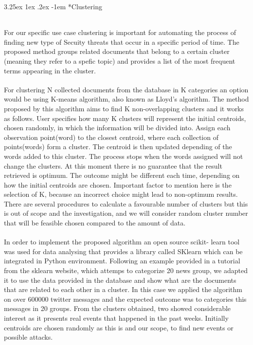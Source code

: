\documentclass[12pt]{article}
\makeatletter
\renewcommand\paragraph{\@startsection{paragraph}{5}{\z@}%
  {3.25ex \@plus1ex \@minus.2ex}%
  {-1em}%
  {\normalfont\normalsize\bfseries}}
\makeatother
\begin{document}
\paragraph*{Clustering}
\hfill \break 
\\
For our specific use case clustering is important for automating the process of finding new type of Secuity threats that occur in a specific period of time. The proposed method groups related documents that belong to a certain cluster (meaning they refer to a spefic topic) and provides a list of the most frequent terms appearing in the cluster.
\\
\\
For clustering N collected documents from the database in K categories an option would be using K-means\cite{k-means} algorithm, also known as Lloyd's algorithm. The method\cite{k-means-example} proposed by this algorithm aims to find K non-overlapping clusters and it works as follows. User specifies how many K clusters will represent the initial centroids, chosen randomly, in which the information will be divided into. Assign each observation point(word) to the closest centroid, where each collection of points(words) form a cluster. The centroid is then updated depending of the words added to this cluster. The process stops when the words assigned will not change the clusters. At this moment there is no guarantee that the result retrieved is optimum. The outcome might be different each time, depending on how the initial centroids are chosen. Important factor to mention here is the selection of K, because an incorrect choice might lead to non-optimum results. There are several procedures\cite{procedures-for-kmeans} to calculate a favourable number of clusters but this is out of scope and the investigation, and we will consider random cluster number that will be feasible chosen compared to the amount of data.
\\
\\
In order to implement the proposed algorithm an open  source scikit- learn \cite{sklearn} tool was used for data analysing that provides a library called SKlearn which can be integrated in Python environment. Following an example provided in a tutorial from the sklearn website, which attemps to categorize 20 news group\cite{k-means-20news}, we adapted it to use the data provided in the database and show what are the documents that are related to each other in a cluster.  In this case we applied the algorithm on over 600000 twitter messages and the expected outcome was to categories this messages in 20 groups. From the clusters obtained, two showed considerable interest as it presents real events that happened in the past weeks. Initially centroids are chosen randomly as this is and our scope, to find new events or possible attacks.
\end{document}
